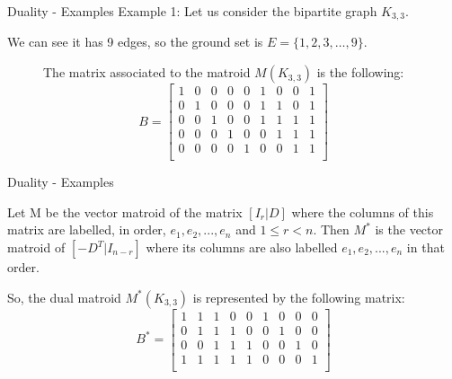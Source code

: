 \documentclass{beamer}
\begin{document}
\begin{frame}{Duality - Examples}
    Example 1:
    Let us consider the bipartite graph $K_{3,3}$. 
    \pause
    \begin{figure}
    \centering
    \end{figure}
    We can see it has 9 edges, so the ground set is $E=\{1,2,3, \dots, 9\} $.
    \pause
    \begin{figure}
    The matrix associated to the matroid $M(K_{3,3})$ is the following:
    $$B = \begin{bmatrix}
    1 & 0 & 0 & 0 & 0 & 1 & 0 & 0 & 1\\
    0 & 1 & 0 & 0 & 0 & 1 & 1 & 0 & 1\\
    0 & 0 & 1 & 0 & 0 & 1 & 1 & 1 & 1\\
    0 & 0 & 0 & 1 & 0 & 0 & 1 & 1 & 1\\
    0 & 0 & 0 & 0 & 1 & 0 & 0 & 1 & 1\\
    \end{bmatrix}$$
    \end{figure}
\end{frame}

\begin{frame}{Duality - Examples}

\begin{theorem} Let M be the vector matroid of the matrix $[I_r|D]$ where the columns of this matrix are labelled, in order, $e_1, e_2,...,e_n$ and $1 \leq r< n$. \pause Then $M^*$ is the vector matroid of $[-D^T|I_{n-r}]$ where its columns are also labelled $e_1, e_2,...,e_n$ in that order.
\end{theorem}
\pause
So, the dual matroid $M^*(K_{3,3})$ is represented by the following matrix:
$$B^* = \begin{bmatrix}
1 & 1 & 1 & 0 & 0 & 1 & 0 & 0 & 0\\
0 & 1 & 1 & 1 & 0 & 0 & 1 & 0 & 0\\
0 & 0 & 1 & 1 & 1 & 0 & 0 & 1 & 0\\
1 & 1 & 1 & 1 & 1 & 0 & 0 & 0 & 1\\
\end{bmatrix}$$

\end{frame}
\end{document}
